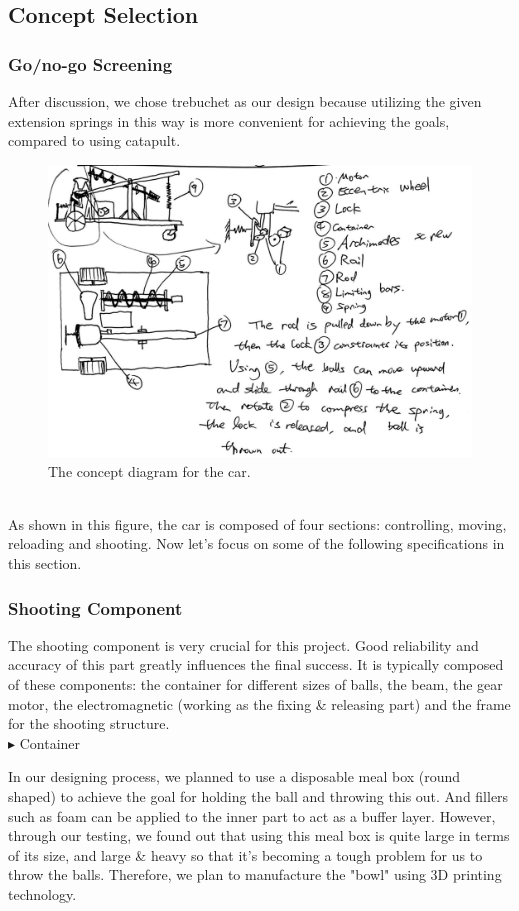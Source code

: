 \documentclass{article}
\begin{document}
%
%
\subsection{Concept Selection}
\subsubsection{Go/no-go Screening}
After discussion, we chose trebuchet as our design because utilizing the given extension springs in this way is more convenient for achieving the goals, compared to using catapult. \\

\begin{figure}[h!]
\centering
\includegraphics[width=0.8\linewidth]{Concept}
\caption{The concept diagram for the car.}
\end{figure}
~\\

As shown in this figure, the car is composed of four sections: controlling, moving, reloading and shooting. Now let's focus on some of the following specifications in this section.
\subsubsection*{Shooting Component}
The shooting component is very crucial for this project. Good reliability and accuracy of this part greatly influences the final success. It is typically composed of these components: the container for different sizes of balls, the beam, the gear motor, the electromagnetic (working as the fixing \& releasing part) and the frame for the shooting structure.\\

$\blacktriangleright$ Container
\par In our designing process, we planned to use a disposable meal box (round shaped) to achieve the goal for holding the ball and throwing this out. And fillers such as foam can be applied to the inner part to act as a buffer layer. However, through our testing, we found out that using this meal box is quite large in terms of its size, and large \& heavy so that it's becoming a tough problem for us to throw the balls. Therefore, we plan to manufacture the "bowl" using 3D printing technology.\\
\end{document}
